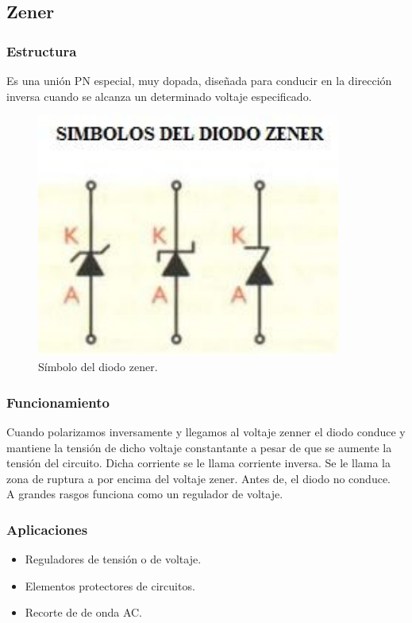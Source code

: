 \documentclass[letterpaper, 12pt]{article}
\begin{document}
\begin{justify}
        \subsection{Zener}
        \subsubsection{Estructura}
        Es una unión PN especial, muy dopada, diseñada para conducir en la dirección inversa cuando se alcanza un determinado voltaje especificado.
        \begin{figure}
            \centering
            \includegraphics[width=10cm]{zener.jpg}
            \caption{Símbolo del diodo zener.}
            \label{fig:simzener}
        \end{figure}
        \subsubsection{Funcionamiento}
        Cuando polarizamos inversamente y llegamos al voltaje zenner el diodo conduce y mantiene la tensión de dicho voltaje constantante a pesar de que se aumente la tensión del circuito.
        Dicha corriente se le llama corriente inversa. Se le llama la zona de ruptura a por encima del voltaje zener. Antes de, el diodo no conduce.\\ \newline
        A grandes rasgos funciona como un regulador de voltaje.
        \subsubsection{Aplicaciones}
        \begin{itemize}
            \item Reguladores de tensión o de voltaje.
            \item Elementos protectores de circuitos.
            \item Recorte de de onda AC.
        \end{itemize}

\end{justify}
\end{document}
